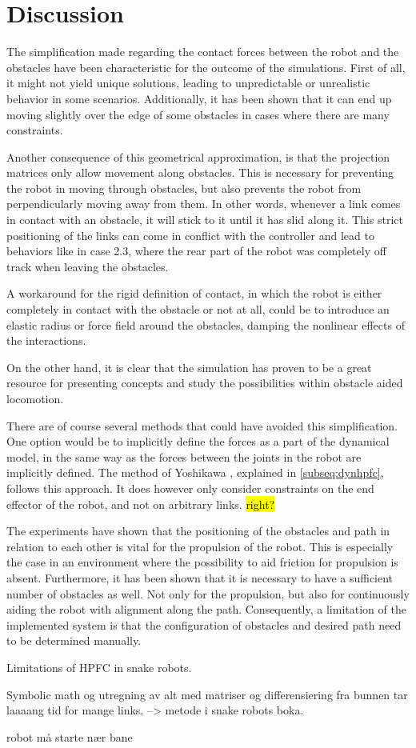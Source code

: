 \chapter{Discussion} \label{ch:discussion}

The simplification made regarding the contact forces between the robot and the obstacles have been characteristic for the outcome of the simulations. First of all, it might not yield unique solutions, leading to unpredictable or unrealistic behavior in some scenarios. Additionally, it has been shown that it can end up moving slightly over the edge of some obstacles in cases where there are many constraints.

Another consequence of this geometrical approximation, is that the projection matrices only allow movement along obstacles. This is necessary for preventing the robot in moving through obstacles, but also prevents the robot from perpendicularly moving away from them. In other words, whenever a link comes in contact with an obstacle, it will stick to it until it has slid along it. This strict positioning of the links can come in conflict with the controller and lead to behaviors like in case 2.3, where the rear part of the robot was completely off track when leaving the obstacles.

A workaround for the rigid definition of contact, in which the robot is either completely in contact with the obstacle or not at all, could be to introduce an elastic radius or force field around the obstacles, damping the nonlinear effects of the interactions. %

On the other hand, it is clear that the simulation has proven to be a great resource for presenting concepts and study the possibilities within obstacle aided locomotion.

There are of course several methods that could have avoided this simplification.
One option would be to implicitly define the forces as a part of the dynamical model, in the same way as the forces between the joints in the robot are implicitly defined. The method of Yoshikawa \cite{yoshikawa1987dynamic}, explained in \ref{subseq:dynhpfc}, follows this approach. It does however only consider constraints on the end effector of the robot, and not on arbitrary links. \hl{right?}

The experiments have shown that the positioning of the obstacles and path in relation to each other is vital for the propulsion of the robot. This is especially the case in an environment where the possibility to aid friction for propulsion is absent. Furthermore, it has been shown that it is necessary to have a sufficient number of obstacles as well. Not only for the propulsion, but also for continuously aiding the robot with alignment along the path. Consequently, a limitation of the implemented system is that the configuration of obstacles and desired path need to be determined manually.


Limitations of HPFC in snake robots.

Symbolic math og utregning av alt med matriser og differensiering fra bunnen tar laaaang tid for mange links. --> metode i snake robots boka.

robot må starte nær bane
